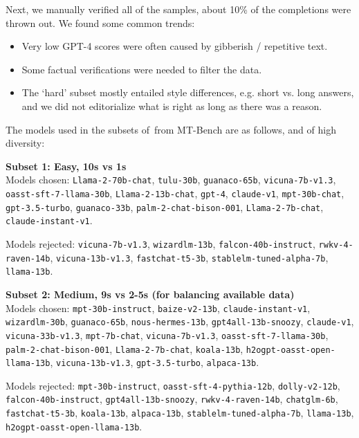 \begin{appendices}
Next, we manually verified all of the samples, about 10\% of the completions were thrown out.
We found some common trends:
\begin{itemize}
    \item Very low GPT-4 scores were often caused by gibberish / repetitive text.
    \item Some factual verifications were needed to filter the data.
    \item The `hard' subset mostly entailed style differences, e.g. short vs. long answers, and we did not editorialize what is right as long as there was a reason.
\end{itemize}

The models used in the subsets of~\name from MT-Bench are as follows, and of high diversity:

\textbf{Subset 1: Easy, 10s vs 1s} \\

Models chosen:
\texttt{Llama-2-70b-chat},
\texttt{tulu-30b},
\texttt{guanaco-65b},
\texttt{vicuna-7b-v1.3},
\texttt{oasst-sft-7-llama-30b},
\texttt{Llama-2-13b-chat},
\texttt{gpt-4},
\texttt{claude-v1},
\texttt{mpt-30b-chat},
\texttt{gpt-3.5-turbo},
\texttt{guanaco-33b},
\texttt{palm-2-chat-bison-001},
\texttt{Llama-2-7b-chat},
\texttt{claude-instant-v1}.

Models rejected:
\texttt{vicuna-7b-v1.3},
\texttt{wizardlm-13b},
\texttt{falcon-40b-instruct},
\texttt{rwkv-4-raven-14b},
\texttt{vicuna-13b-v1.3},
\texttt{fastchat-t5-3b},
\texttt{stablelm-tuned-alpha-7b},
\texttt{llama-13b}.

\textbf{Subset 2: Medium, 9s vs 2-5s (for balancing available data)} \\

Models chosen:
\texttt{mpt-30b-instruct},
\texttt{baize-v2-13b},
\texttt{claude-instant-v1},
\texttt{wizardlm-30b},
\texttt{guanaco-65b},
\texttt{nous-hermes-13b},
\texttt{gpt4all-13b-snoozy},
\texttt{claude-v1},
\texttt{vicuna-33b-v1.3},
\texttt{mpt-7b-chat},
\texttt{vicuna-7b-v1.3},
\texttt{oasst-sft-7-llama-30b},
\texttt{palm-2-chat-bison-001},
\texttt{Llama-2-7b-chat},
\texttt{koala-13b},
\texttt{h2ogpt-oasst-open-llama-13b},
\texttt{vicuna-13b-v1.3},
\texttt{gpt-3.5-turbo},
\texttt{alpaca-13b}.

Models rejected:
\texttt{mpt-30b-instruct},
\texttt{oasst-sft-4-pythia-12b},
\texttt{dolly-v2-12b},
\texttt{falcon-40b-instruct},
\texttt{gpt4all-13b-snoozy},
\texttt{rwkv-4-raven-14b},
\texttt{chatglm-6b},
\texttt{fastchat-t5-3b},
\texttt{koala-13b},
\texttt{alpaca-13b},
\texttt{stablelm-tuned-alpha-7b},
\texttt{llama-13b},
\texttt{h2ogpt-oasst-open-llama-13b}.


\end{appendices}
